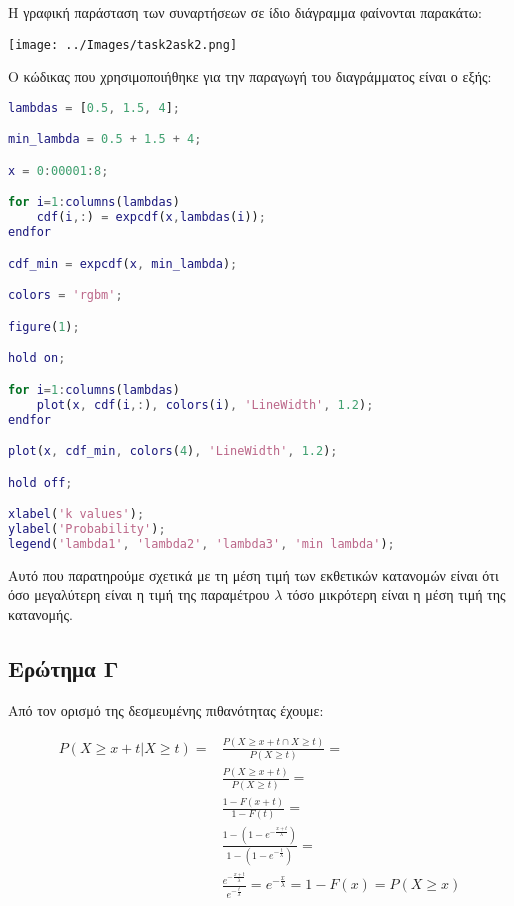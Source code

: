 \documentclass[12pt]{article}
\begin{document}
H γραφική παράσταση των συναρτήσεων σε ίδιο διάγραμμα φαίνονται παρακάτω:

\begin{center}
    \texttt{[image: ../Images/task2ask2.png]}
\end{center}

Ο κώδικας που χρησιμοποιήθηκε για την παραγωγή του διαγράμματος είναι ο εξής:

\begin{lstlisting}[language=Matlab]
lambdas = [0.5, 1.5, 4];

min_lambda = 0.5 + 1.5 + 4;

x = 0:00001:8;

for i=1:columns(lambdas)
	cdf(i,:) = expcdf(x,lambdas(i));
endfor

cdf_min = expcdf(x, min_lambda);

colors = 'rgbm';

figure(1);

hold on;

for i=1:columns(lambdas)
	plot(x, cdf(i,:), colors(i), 'LineWidth', 1.2);
endfor

plot(x, cdf_min, colors(4), 'LineWidth', 1.2);

hold off;

xlabel('k values');
ylabel('Probability');
legend('lambda1', 'lambda2', 'lambda3', 'min lambda');

\end{lstlisting}

Αυτό που παρατηρούμε σχετικά με τη μέση τιμή των εκθετικών κατανομών είναι ότι όσο
μεγαλύτερη είναι η τιμή της παραμέτρου $\lambda$ τόσο μικρότερη είναι η μέση τιμή της
κατανομής.



\subsection{Ερώτημα Γ}
Από τον ορισμό της δεσμευμένης πιθανότητας έχουμε: 

\begin{equation}
    \begin{split}
    P(X \geq x + t | X \geq t) =
    & \frac{P(X \geq x + t \cap X \geq t)}{P(X \geq t)} = \\
    & \frac{P(X \geq x + t)}{P(X \geq t)} = \\
    & \frac{1 - F(x + t)}{1 - F(t)} = \\
    & \frac{1 - (1 - e^{-\frac{x + t}{\lambda}})}{1 - (1 - e^{-\frac{t}{\lambda}})} = \\
    & \frac{e^{-\frac{x + t}{\lambda}}}{e^{-\frac{t}{\lambda}}} = e^{-\frac{x}{\lambda}} = 1 - F(x) = P(X \geq x)
\end{split}
\end{equation}
\end{document}
